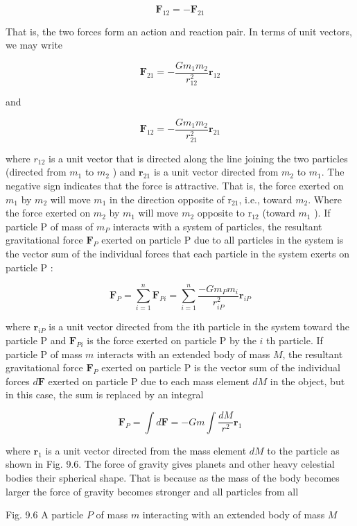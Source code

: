 \documentclass[10pt]{article}
\begin{document}
$$
\mathbf{F}_{12}=-\mathbf{F}_{21}
$$

That is, the two forces form an action and reaction pair. In terms of unit vectors, we may write

$$
\mathbf{F}_{21}=-\frac{G m_{1} m_{2}}{r_{12}^{2}} \mathbf{r}_{12}
$$

and

$$
\mathbf{F}_{12}=-\frac{G m_{1} m_{2}}{r_{21}^{2}} \mathbf{r}_{21}
$$

where $r_{12}$ is a unit vector that is directed along the line joining the two particles (directed from $m_{1}$ to $m_{2}$ ) and $\mathbf{r}_{21}$ is a unit vector directed from $m_{2}$ to $m_{1}$. The negative sign indicates that the force is attractive. That is, the force exerted on $m_{1}$ by $m_{2}$ will move $m_{1}$ in the direction opposite of $\mathrm{r}_{21}$, i.e., toward $m_{2}$. Where the force exerted on $m_{2}$ by $m_{1}$ will move $m_{2}$ opposite to $\mathrm{r}_{12}$ (toward $m_{1}$ ). If particle P of mass of $m_{P}$ interacts with a system of particles, the resultant gravitational force $\mathbf{F}_{P}$ exerted on particle P due to all particles in the system is the vector sum of the individual forces that each particle in the system exerts on particle P :

$$
\mathbf{F}_{P}=\sum_{i=1}^{n} \mathbf{F}_{P i}=\sum_{i=1}^{n} \frac{-G m_{P} m_{i}}{r_{i P}^{2}} \mathbf{r}_{i P}
$$

where $\mathbf{r}_{i P}$ is a unit vector directed from the ith particle in the system toward the particle P and $\mathbf{F}_{P i}$ is the force exerted on particle P by the $i$ th particle. If particle P of mass $m$ interacts with an extended body of mass $M$, the resultant gravitational force $\mathbf{F}_{P}$ exerted on particle P is the vector sum of the individual forces $d \mathbf{F}$ exerted on particle P due to each mass element $d M$ in the object, but in this case, the sum is replaced by an integral

$$
\mathbf{F}_{P}=\int d \mathbf{F}=-G m \int \frac{d M}{r^{2}} \mathbf{r}_{1}
$$

where $\mathbf{r}_{1}$ is a unit vector directed from the mass element $d M$ to the particle as shown in Fig. 9.6. The force of gravity gives planets and other heavy celestial bodies their spherical shape. That is because as the mass of the body becomes larger the force of gravity becomes stronger and all particles from all

Fig. 9.6 A particle $P$ of mass $m$ interacting with an extended body of mass $M$
\end{document}
